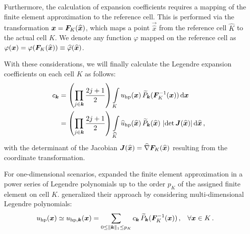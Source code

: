 Furthermore, the calculation of expansion coefficients requires a mapping of the finite element approximation to the reference cell. This is performed via the transformation $\vec{x} = \mat{F}_K(\vec{\widehat{x}})$, which maps a point $\vec{\widehat{x}}$ from the reference cell $\widehat{K}$ to the actual cell $K$. We denote any function $\varphi$ mapped on the reference cell as $\varphi(\vec{x}) = \varphi(\mat{F}_K(\vec{\widehat{x}})) \equiv \widehat{\varphi}(\vec{\widehat{x}})$. \textcite{dealiimapping}

With these considerations, we will finally calculate the Legendre expansion coefficients on each cell $K$ as follows:
\begin{align}
c_\tuple{k} &=
\left(\prod\limits_{j \in \tuple{k}} \frac{2j+1}{2}\right) \int\limits_{K} u_\text{hp}(\vec{x}) \, \widetilde{P}_\tuple{k}(\mat{F}_K^{-1}(\vec{x})) \differential{\vec{x}} \\
&= \left(\prod\limits_{j \in \tuple{k}} \frac{2j+1}{2}\right) \int\limits_{\widehat{K}} \widehat{u}_\text{hp}(\vec{\widehat{x}}) \, \widetilde{P}_\tuple{k}(\vec{\widehat{x}}) \, \left|\det \mat{J}(\vec{\widehat{x}})\right| \differential{\vec{\widehat{x}}} \,\text{,}
\end{align}
with the determinant of the Jacobian $\mat{J}(\vec{\widehat{x}}) = \widehat{\nabla} \mat{F}_K (\vec{\widehat{x}})$ resulting from the coordinate transformation. \textcite{dealiilegendre}

For one-dimensional scenarios, \textcite{mavriplis1994} expanded the finite element approximation in a power series of Legendre polynomials up to the order $p_K$ of the assigned finite element on cell $K$. \textcites{houston2005}{eibner2007} generalized their approach by considering multi-dimensional Legendre polynomials:
\begin{align}
u_\text{hp} (\vec{x}) \simeq u_{\text{hp},\tuple{k}} (\vec{x}) &= \sum\limits_{0 \leq \|\tuple{k}\|_1 \leq p_K} c_\tuple{k} \, \widetilde{P}_\tuple{k}(\mat{F}_K^{-1}(\vec{x})) \,\text{,} \quad \forall \vec{x} \in K \,\text{.}
\end{align}

